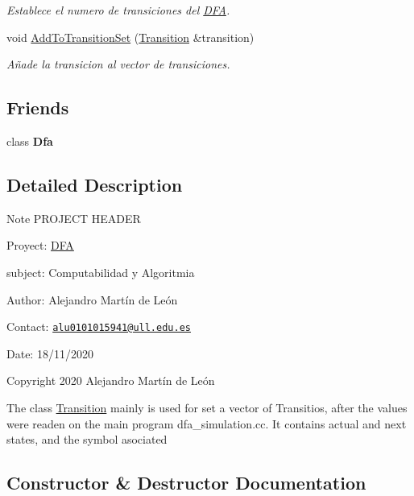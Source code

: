 \begin{DoxyCompactItemize}
\begin{DoxyCompactList}\small\item\em Establece el numero de transiciones del \hyperlink{classDFA}{D\+FA}. \end{DoxyCompactList}\item 
\mbox{\label{classTransition_a03732624209bd0e25ee8dd57f113304c}} 
void \hyperlink{classTransition_a03732624209bd0e25ee8dd57f113304c}{Add\+To\+Transition\+Set} (\hyperlink{classTransition}{Transition} \&transition)
\begin{DoxyCompactList}\small\item\em Añade la transicion al vector de transiciones. \end{DoxyCompactList}\end{DoxyCompactItemize}
\subsection*{Friends}
\begin{DoxyCompactItemize}
\item 
\mbox{\label{classTransition_a21ab7f6ff9e8704242e18ecfde24a901}} 
class {\bfseries Dfa}
\end{DoxyCompactItemize}


\subsection{Detailed Description}
\begin{DoxyNote}{Note}
P\+R\+O\+J\+E\+CT H\+E\+A\+D\+ER 

Proyect\+: \hyperlink{classDFA}{D\+FA} 

subject\+: Computabilidad y Algoritmia 

Author\+: Alejandro Martín de León 

Contact\+: \href{mailto:alu0101015941@ull.edu.es}{\tt alu0101015941@ull.\+edu.\+es} 

Date\+: 18/11/2020 

Copyright 2020 Alejandro Martín de León
\end{DoxyNote}
The class \hyperlink{classTransition}{Transition} mainly is used for set a vector of Transitios, after the values were readen on the main program dfa\+\_\+simulation.\+cc. It contains actual and next states, and the symbol asociated 

\subsection{Constructor \& Destructor Documentation}
\mbox{\label{classTransition_a73b44b2338b11807f77b620a3e810f92}} 
